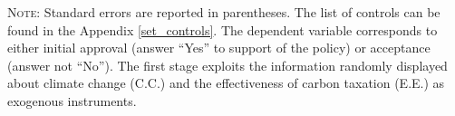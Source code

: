 \documentclass[12pt]{article} %
\begin{document}
\begin{table}[!htbp] \centering 
  \caption{Effect of believing in environmental effectiveness on approval} 
  \label{tab:ee} 
 {\footnotesize \parbox[t]{\textwidth}{\linespread{1.2}\selectfont \textsc{Note:} Standard errors are reported in parentheses. The list of controls can be found in the Appendix \ref{set_controls}. The dependent variable corresponds to either initial approval (answer ``Yes'' to support of the policy) or acceptance (answer not ``No''). The first stage exploits the information randomly displayed about climate change (C.C.) and the effectiveness of carbon taxation (E.E.) as exogenous instruments.}}\end{table}
\end{document}
